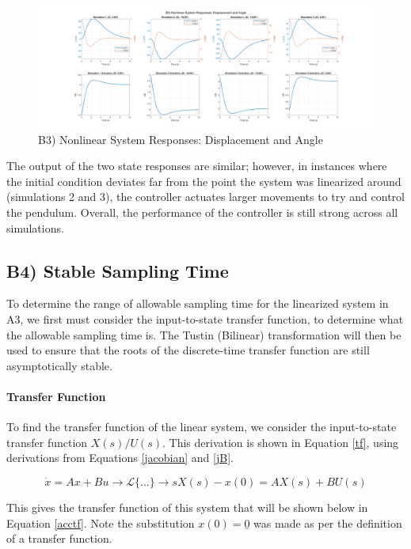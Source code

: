 \documentclass{article}
\begin{document}
\begin{figure}[H]
    \centering
    \includegraphics[width=\textwidth]{figures/b3_x.png}
    \caption{B3) Nonlinear System Responses: Displacement and Angle}
    \label{B3}
\end{figure}

The output of the two state responses are similar; however, in instances where the initial condition deviates far from the point the system was linearized around (simulations 2 and 3), the controller actuates larger movements to try and control the pendulum. Overall, the performance of the controller is still strong across all simulations.

\subsection*{B4) Stable Sampling Time}

To determine the range of allowable sampling time for the linearized system in A3, we first must consider the input-to-state transfer function, to determine what the allowable sampling time is. The Tustin (Bilinear) transformation will then be used to ensure that the roots of the discrete-time transfer function are still asymptotically stable.

\paragraph{Transfer Function}
To find the transfer function of the linear system, we consider the input-to-state transfer function $X(s)/U(s)$. This derivation is shown in Equation \ref{tf}, using derivations from Equations \ref{jacobian} and \ref{jB}. 


\begin{equation}\label{tf}
\dot x = Ax+Bu \rightarrow \mathcal{L}\{...\} \rightarrow sX(s)-x(0)=AX(s)+BU(s)
\end{equation}

This gives the transfer function of this system that will be shown below in Equation \ref{acctf}. Note the substitution $x(0)=\underline{0}$ was made as per the definition of a transfer function.
\end{document}
